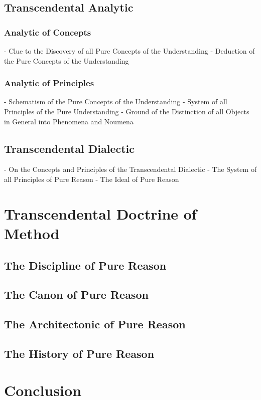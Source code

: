 \documentclass[a4paper]{article}
\begin{document}
\subsection{Transcendental Analytic}
\subsubsection{Analytic of Concepts}
- Clue to the Discovery of all Pure Concepts of the Understanding
- Deduction of the Pure Concepts of the Understanding

\subsubsection{Analytic of Principles}
- Schematism of the Pure Concepts of the Understanding
- System of all Principles of the Pure Understanding
- Ground of the Distinction of all Objects in General into Phenomena and Noumena

\subsection{Transcendental Dialectic}
- On the Concepts and Principles of the Transcendental Dialectic
- The System of all Principles of Pure Reason
- The Ideal of Pure Reason

\section{Transcendental Doctrine of Method}

\subsection{The Discipline of Pure Reason}

\subsection{The Canon of Pure Reason}

\subsection{The Architectonic of Pure Reason}

\subsection{The History of Pure Reason}

\section{Conclusion}



\printbibliography
\end{document}

